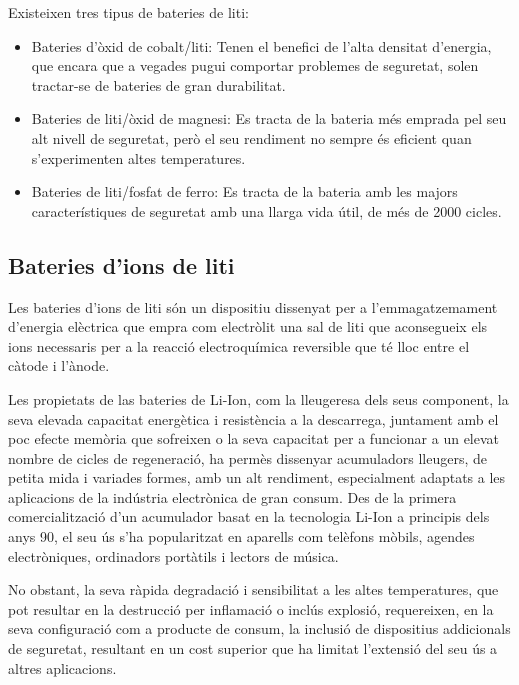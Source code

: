 Existeixen tres tipus de bateries de liti:
\begin{itemize}
    \item Bateries d’òxid de cobalt/liti: Tenen el benefici de l’alta densitat \newline d’energia, que encara que a vegades pugui comportar problemes de seguretat, solen tractar-se de bateries de gran durabilitat.
    \item Bateries de liti/òxid de magnesi: Es tracta de la bateria més emprada pel seu alt nivell de seguretat, però el seu rendiment no sempre és eficient quan s’experimenten altes temperatures.
    \item Bateries de liti/fosfat de ferro: Es tracta de la bateria amb les majors característiques de seguretat amb una llarga vida útil, de més de 2000 cicles. 
\end{itemize}

\subsection{Bateries d'ions de liti}
Les bateries d'ions de liti són un dispositiu dissenyat per a \newline l'emmagatzemament d’energia elèctrica que empra com electròlit una sal de liti que aconsegueix els ions necessaris per a la reacció electroquímica reversible que té lloc entre el càtode i l'ànode.

Les propietats de las bateries de Li-Ion, com la lleugeresa dels seus component, la seva elevada capacitat energètica i resistència a la descarrega, juntament amb el poc efecte memòria que sofreixen o la seva capacitat per a funcionar a un elevat nombre de cicles de regeneració, ha permès dissenyar acumuladors lleugers, de petita mida i variades formes, amb un alt rendiment, especialment adaptats a les aplicacions de la indústria electrònica de gran consum. Des de la primera comercialització d’un acumulador basat en la tecnologia Li-Ion a principis dels anys 90, el seu ús s’ha popularitzat en aparells com telèfons mòbils, agendes electròniques, ordinadors portàtils i lectors de música.

No obstant, la seva ràpida degradació i sensibilitat a les altes temperatures, que pot resultar en la destrucció per inflamació o inclús explosió, requereixen, en la seva configuració com a producte de consum, la inclusió de dispositius addicionals de seguretat, resultant en un cost superior que ha limitat l’extensió del seu ús a altres aplicacions.


